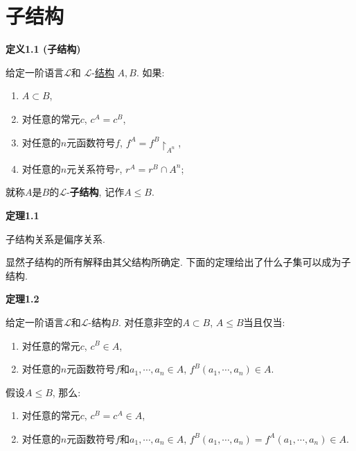 \documentclass[UTF8]{ctexart}
\begin{document}
\setlength{\abovedisplayskip}{1pt}
\setlength{\belowdisplayskip}{1pt}

\section{子结构}

\hypertarget{sec:定义1.1}{}
\noindent\textbf{定义1.1 (子结构)}

给定一阶语言$\mathcal{L}$和
$\mathcal{L}$-\href{01 一阶语言的结构#nameddest=sec:定义1.1}{结构} $A,B$. 如果:
\begin{enumerate}
    \item $A\subset B$,
    \item 对任意的常元$c$, $c^A=c^B$,
    \item 对任意的$n$元函数符号$f$, $f^A=f^B\!\restriction_{A^n}$,
    \item 对任意的$n$元关系符号$r$, $r^A=r^B\cap A^n$;
\end{enumerate}
就称$A$是$B$的$\mathcal{L}$-\textbf{子结构}, 记作$A\leqslant B$.

\vspace{10pt}

\hypertarget{sec:定理1.1}{}
\noindent\textbf{定理1.1}

子结构关系是偏序关系.

\vspace{10pt}

显然子结构的所有解释由其父结构所确定. 下面的定理给出了什么子集可以成为子结构.

\vspace{10pt}

\hypertarget{sec:定理1.2}{}
\noindent\textbf{定理1.2}

给定一阶语言$\mathcal{L}$和$\mathcal{L}$-结构$B$.
对任意非空的$A\subset B$, $A\leqslant B$当且仅当:
\begin{enumerate}
    \item 对任意的常元$c$, $c^B\in A$,
    \item 对任意的$n$元函数符号$f$和$a_1,\cdots,a_n\in A$, $f^B(a_1,\cdots,a_n)\in A$.
\end{enumerate}



假设$A\leqslant B$, 那么:
\begin{enumerate}
    \item 对任意的常元$c$, $c^B=c^A\in A$,
    \item 对任意的$n$元函数符号$f$和$a_1,\cdots,a_n\in A$,
    $f^B(a_1,\cdots,a_n)=f^A(a_1,\cdots,a_n)\in A$.
\end{enumerate}
\end{document}
